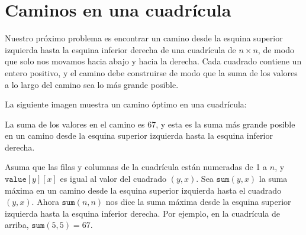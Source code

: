 \section{Caminos en una cuadrícula}

Nuestro próximo problema es encontrar un camino
desde la esquina superior izquierda hasta
la esquina inferior derecha
de una cuadrícula de $n \times n$, de modo que
solo nos movamos hacia abajo y hacia la derecha.
Cada cuadrado contiene un entero positivo,
y el camino debe construirse de modo que
la suma de los valores a lo largo
del camino sea lo más grande posible.

La siguiente imagen muestra un camino óptimo
en una cuadrícula:
\begin{center}
\end{center}
La suma de los valores en el camino es 67,
y esta es la suma más grande posible en un camino
desde la
esquina superior izquierda hasta la esquina inferior derecha.

Asuma que las filas y columnas de la
cuadrícula están numeradas de 1 a $n$,
y $\texttt{value}[y][x]$ es igual al valor
del cuadrado $(y,x)$.
Sea $\texttt{sum}(y,x)$ la suma máxima
en un camino desde la esquina superior izquierda
hasta el cuadrado $(y,x)$.
Ahora $\texttt{sum}(n,n)$ nos dice
la suma máxima
desde la esquina superior izquierda hasta
la esquina inferior derecha.
Por ejemplo, en la cuadrícula de arriba,
$\texttt{sum}(5,5)=67$.


